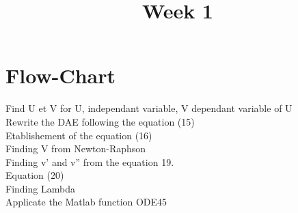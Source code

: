 \documentclass[a4paper,10pt]{article}
\title{ Week 1}
\begin{document}
\maketitle

\vspace{0.7cm}

\section*{Flow-Chart}

Find U et V for U, independant variable, V dependant variable of U \\
Rewrite the DAE following the equation (15) \\
Etablishement of the equation (16)\\
Finding V from Newton-Raphson\\
Finding v' and v'' from the equation 19.\\
Equation (20)\\
Finding Lambda\\
Applicate the Matlab function ODE45\\

\printbibliography
\end{document}
